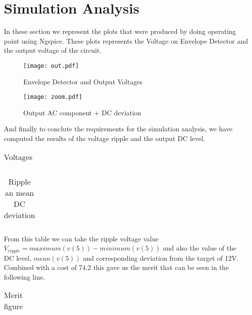 \section{Simulation Analysis}
\label{sec:simulation} 

\par In these section we represent the plots that were produced by doing operating point using Ngspice. These plots represents the Voltage on Envelope Detector and the output voltage of the circuit.


\begin{figure} [!htb] 
  \texttt{[image: out.pdf]}
  \caption{Envelope Detector and Output Voltages}
  \label{fig:theoplots}
  \endminipage\hfill
\end{figure}



\begin{figure} [!htb]
  \texttt{[image: zoom.pdf]}
  \caption{Output AC component + DC deviation}
  \label{fig:theoplots}
  \endminipage\hfill
\end{figure}


\par And finally to conclute the requirements for the simulation analysis, we have computed the results of the voltage ripple and the output DC level.  

\FloatBarrier
\begin{table}[h]
  \centering
  \begin{tabular}{|c|c|c|}
    \hline    
    
    \hline
  \end{tabular}
  \caption{Voltages}
  \label{tab:Spice1}
\end{table}
\FloatBarrier  

\FloatBarrier
\begin{table}[h]
  \centering
  \begin{tabular}{|c|c|c|}
    \hline    
    
    \hline
  \end{tabular}
  \caption{Ripple an mean DC deviation}
  \label{tab:Spice2}
\end{table}
\FloatBarrier 

From this table we can take the ripple voltage value $V_{ripple}=maximum(v(5))-minimum(v(5))$ and also the value of the DC level, $mean(v(5))$ and corresponding deviation from the target of 12V.\\
Combined with a cost of 74.2 this gave us the merit that can be seen in the following line.


\FloatBarrier
\begin{table}[h]
  \centering
  \begin{tabular}{|c|c|c|}
    \hline    
    
    \hline
  \end{tabular}
  \caption{Merit figure}
  \label{tab:Spice2}
\end{table}
\FloatBarrier 
